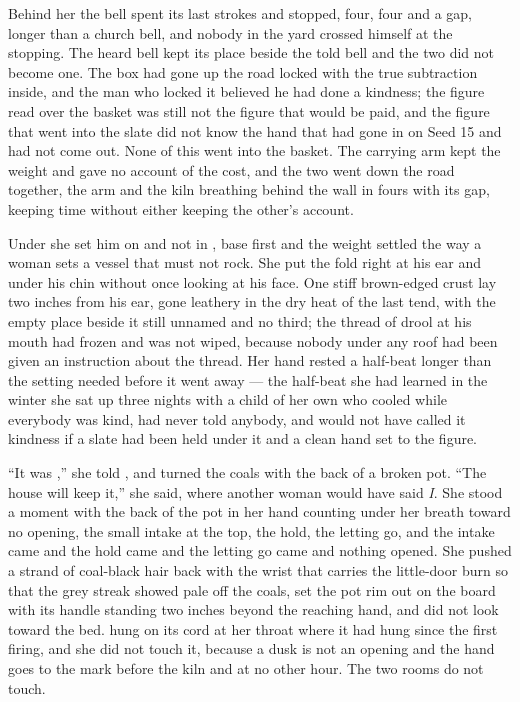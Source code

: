 Behind her the bell spent its last strokes and stopped, four, four and a gap, longer than a church bell, and nobody in the yard crossed himself at the stopping. The heard bell kept its place beside the told bell and the two did not become one. The box had gone up the road locked with the true subtraction inside, and the man who locked it believed he had done a kindness; the figure read over the basket was still not the figure that would be paid, and the figure that went into the slate did not know the hand that had gone in on Seed 15 and had not come out. None of this went into the basket. The carrying arm kept the weight and gave no account of the cost, and the two went down the road together, the arm and the kiln breathing behind the wall in fours with its gap, keeping time without either keeping the other's account.

\scenebreak

Under  she set him on  and not in , base first and the weight settled the way a woman sets a vessel that must not rock. She put the fold right at his ear and under his chin without once looking at his face. One stiff brown-edged crust lay two inches from his ear, gone leathery in the dry heat of the last tend, with the empty place beside it still unnamed and no third; the thread of drool at his mouth had frozen and was not wiped, because nobody under any roof had been given an instruction about the thread. Her hand rested a half-beat longer than the setting needed before it went away --- the half-beat she had learned in the winter she sat up three nights with a child of her own who cooled while everybody was kind, had never told anybody, and would not have called it kindness if a slate had been held under it and a clean hand set to the figure.

“It was ,” she told , and turned the coals with the back of a broken pot. “The house will keep it,” she said, where another woman would have said \emph{I}. She stood a moment with the back of the pot in her hand counting under her breath toward no opening, the small intake at the top, the hold, the letting go, and the intake came and the hold came and the letting go came and nothing opened. She pushed a strand of coal-black hair back with the wrist that carries the little-door burn so that the grey streak showed pale off the coals, set the pot rim out on the board with its handle standing two inches beyond the reaching hand, and did not look toward the bed.  hung on its cord at her throat where it had hung since the first firing, and she did not touch it, because a dusk is not an opening and the hand goes to the mark before the kiln and at no other hour. The two rooms do not touch.

